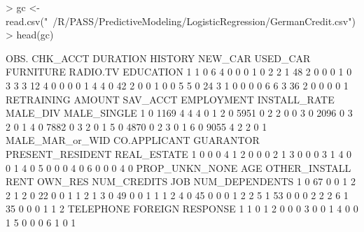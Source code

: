 \documentclass{article}
\begin{document}
\begin{Schunk}
\begin{Sinput}
> gc <- read.csv("~/R/PASS/PredictiveModeling/LogisticRegression/GermanCredit.csv")
> head(gc)
\end{Sinput}
\begin{Soutput}
  OBS. CHK_ACCT DURATION HISTORY NEW_CAR USED_CAR FURNITURE RADIO.TV EDUCATION
1    1        0        6       4       0        0         0        1         0
2    2        1       48       2       0        0         0        1         0
3    3        3       12       4       0        0         0        0         1
4    4        0       42       2       0        0         1        0         0
5    5        0       24       3       1        0         0        0         0
6    6        3       36       2       0        0         0        0         1
  RETRAINING AMOUNT SAV_ACCT EMPLOYMENT INSTALL_RATE MALE_DIV MALE_SINGLE
1          0   1169        4          4            4        0           1
2          0   5951        0          2            2        0           0
3          0   2096        0          3            2        0           1
4          0   7882        0          3            2        0           1
5          0   4870        0          2            3        0           1
6          0   9055        4          2            2        0           1
  MALE_MAR_or_WID CO.APPLICANT GUARANTOR PRESENT_RESIDENT REAL_ESTATE
1               0            0         0                4           1
2               0            0         0                2           1
3               0            0         0                3           1
4               0            0         1                4           0
5               0            0         0                4           0
6               0            0         0                4           0
  PROP_UNKN_NONE AGE OTHER_INSTALL RENT OWN_RES NUM_CREDITS JOB NUM_DEPENDENTS
1              0  67             0    0       1           2   2              1
2              0  22             0    0       1           1   2              1
3              0  49             0    0       1           1   1              2
4              0  45             0    0       0           1   2              2
5              1  53             0    0       0           2   2              2
6              1  35             0    0       0           1   1              2
  TELEPHONE FOREIGN RESPONSE
1         1       0        1
2         0       0        0
3         0       0        1
4         0       0        1
5         0       0        0
6         1       0        1
\end{Soutput}
\end{Schunk}
\end{document}
